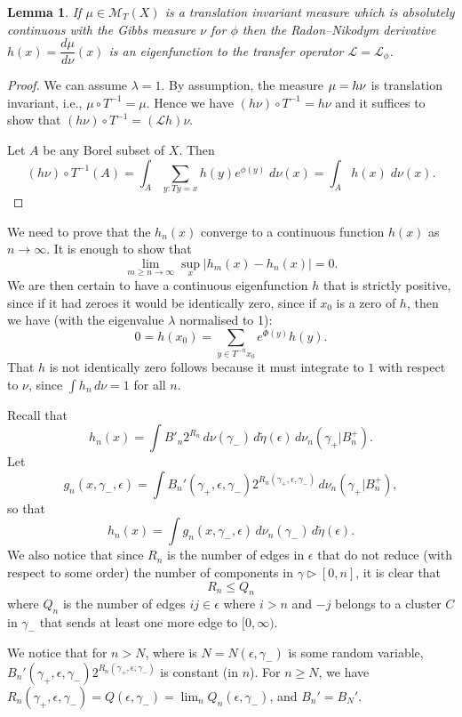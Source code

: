 \documentclass[11pt, a4paper]{amsart}
\newtheorem{lem}[thm]{Lemma}
\theoremstyle{definition}
\theoremstyle{remark}
\renewcommand{\d}{\,d}
\providecommand{\CM}{\mathscr{M}}
\providecommand{\mscr}{\mathscr}
\providecommand{\e}{\epsilon}
\providecommand{\tl}{\tilde}
\providecommand{\g}{\gamma}
\def\X{X}
\def\T{T}
\begin{document}
\begin{lem}
  If $\mu\in\CM_\T(\X)$ is a translation invariant measure which is absolutely
  continuous with the Gibbs measure $\nu$ for $\phi$ then the Radon--Nikodym
  derivative $h(x)=\dfrac{d\mu}{d\nu}(x)$ is an eigenfunction to the transfer
  operator $\mscr L =\mscr L_\phi$.
\end{lem}
\begin{proof}
  We can assume $\lambda=1$. By assumption, the measure $\mu= h \nu$ is translation
  invariant, i.e., $\mu\circ T^{-1}=\mu$. Hence we have $(h\nu)\circ T^{-1}=h\nu$ and it
  suffices to show that $(h\nu) \circ T^{-1}=({\mathcal L}h)\nu$.

  Let $A$ be any Borel subset of $\X$. Then
  $$(h\nu)\circ T^{-1} (A)=\int_A \sum_{y: Ty=x} h(y)e^{\phi(y)}\; d\nu(x)=\int_A h(x)\; d\nu(x).$$
\end{proof}

We need to prove that the $h_n(x)$ converge to a continuous function $h(x)$ as
$n\to\infty$. It is enough to show that
$$ \lim_{m\geq n\to \infty}\sup_{x} |h_m(x)-h_n(x)|=0.$$
We are then certain to have a continuous eigenfunction $h$ that is strictly positive, since if it had zeroes it would be identically zero, since if $x_0$ is a zero of $h$, then we have (with the eigenvalue $\lambda $ normalised to 1):
$$0= h(x_0)=\sum_{y\in T^{-n}x_0} e^{\Phi(y)} h(y).$$
That $h$ is not identically zero follows because it must integrate to $1$ with respect to $\nu$, since $\int h_n \d\nu=1$ for all $n$.

Recall that
\begin{equation}\label{eq:3}
  h_n(x) =  \int B'_n 2^{R_n} \d \nu(\g_-)\d\tl\eta(\e) \d \nu_n(\g_+|B_n^+).
\end{equation}
Let 
$$g_n(x,\gamma_-,\epsilon)=\int B_n' (\gamma_+,\epsilon, \gamma_-) 2^{R_n(\gamma_+,\epsilon,\gamma_-)} \,d\nu_n(\g_+|B_n^+),$$
so that 
$$h_n(x)= \int g_n(x,\gamma_-,\epsilon) \d \nu_n(\g_-)\d\tl\eta(\e).$$
We also notice that since $R_n$ is the number of edges in $\e$ that do not reduce (with respect to
some order) the number of components in $\g\triangleright [0,n]$, it is clear
that
\begin{equation}\label{eq:RleQ}
  R_n \le Q_{n} 
\end{equation}
where \(Q_{n}\) is the number of edges $ij\in\e$ where $i>n$ and $-j$ belongs
to a cluster $C$ in $\g_-$ that sends at least one more edge to $[0,\infty)$.

We notice that  for $n>N$, where is $N=N(\epsilon, \gamma_-)$ is some random variable, $ B_n' (\gamma_+,\epsilon, \gamma_-) 2^{R_n(\gamma_+,\epsilon,\gamma_-)} $ is constant (in $n$). For $n\geq N$, we have $R_n(\gamma_+,\epsilon,\gamma_-)=Q(\epsilon, \gamma_-)=\lim_n Q_n(\epsilon, \gamma_-)$, and $B_n'=B_N'$.
\end{document}
